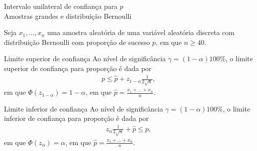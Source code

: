 \documentclass[8pt]{beamer}
\begin{document}
\begin{frame}{Intervalo unilateral de confiança para $p$\\ Amostras grandes e distribuição Bernoulli}

\normalsize

Seja $x_1, \dots, x_n$ uma amostra aleatória de uma variável aleatória discreta com distribuição Bernoulli com proporção de sucesso $p$, em que $n \geq 40$. 

\begin{block}{Limite superior de confiança}
	Ao nível de significância $\gamma=(1-\alpha)100\%$, o limite superior de confiança para proporção é dada por
	\begin{align*}
		p \leq \hat{p} + z_{1-\alpha} \frac{1}{2\sqrt{n}},
	\end{align*}
	em que $\Phi(z_{1-\alpha}) = 1 - \alpha$, em que $\hat{p} = \frac{x_1 + \dots + x_n}{n}$.
	
\end{block}

\begin{block}{Limite inferior de confiança}
	Ao nível de significância $\gamma=(1-\alpha)100\%$, o limite inferior de confiança para proporção é dada por
	\begin{align*}
		z_\alpha \frac{1}{2 \sqrt{n}} + \hat{p} \leq p,
	\end{align*}
	em que $\Phi(z_\alpha) = \alpha$, em que $\hat{p} = \frac{x_1 + \dots + x_n}{n}$.
\end{block}

\normalsize

\end{frame}
\end{document}
